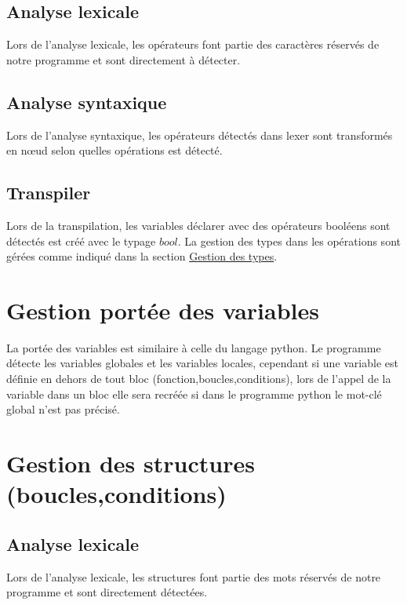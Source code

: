 \subsection*{Analyse lexicale}

Lors de l'analyse lexicale, les opérateurs font partie des caractères réservés de notre programme et sont directement à détecter.

\subsection*{Analyse syntaxique}

Lors de l'analyse syntaxique, les opérateurs détectés dans lexer sont transformés en nœud selon quelles opérations est détecté.

\subsection*{Transpiler}

Lors de la transpilation, les variables déclarer avec des opérateurs booléens sont détectés est créé avec le typage \(bool\).
La gestion des types dans les opérations sont gérées comme indiqué dans la section \hyperref[section:Type]{Gestion des types}.

\section{Gestion portée des variables}

La portée des variables est similaire à celle du langage python.
Le programme détecte les variables globales et les variables locales, cependant si une variable est définie en dehors de tout bloc (fonction,boucles,conditions), lors de l'appel
de la variable dans un bloc elle sera recréée si dans le programme python le mot-clé global n'est pas précisé.

\newpage
\section{Gestion des structures (boucles,conditions)}

\subsection*{Analyse lexicale}

Lors de l'analyse lexicale, les structures font partie des mots réservés de notre programme et sont directement détectées.

